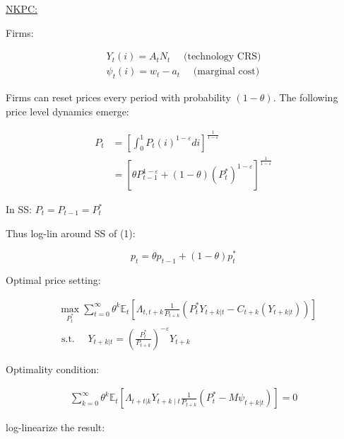 {\begin{enumerate}[label=(\alph*)]
{\underline{NKPC:}

Firms: 

\begin{align*}
    Y_{t}(i)=A_{t} N_{t} \quad \text{ (technology CRS)} \\
    \psi_{t}(i)=w_{t}-a_{t}\quad \text{ (marginal cost)}
\end{align*}

Firms can reset prices every period with probability $(1-\theta)$. The following price level dynamics emerge:

\begin{align*}
P_{t} & =\left[\int_{0}^{1} P_{t}(i)^{1-\varepsilon} d i\right]^{\frac{1}{1-\varepsilon}} \\
& =\left[\theta P_{t-1}^{1-\varepsilon}+(1-\theta)\left(P_{t}^{*}\right)^{1-\varepsilon}\right]^{\frac{1}{1-\varepsilon}} \tag{1}
\end{align*}

In SS: $P_{t}=P_{t-1}=P_{t}^{*}$

Thus log-lin around SS of (1):

$$
p_{t}=\theta p_{t-1}+(1-\theta) p_{t}^{*}
$$

Optimal price setting:

$$
\begin{aligned}
& \max _{P_{t}^{*}} \sum_{t=0}^{\infty} \theta^{k} \mathbb{E}_{t}\left[\Lambda_{t, t+k} \frac{1}{P_{t+k}}\left(P_{t}^{*} Y_{t+k|t}-C_{t+k}\left(Y_{t+k | t}\right)\right)\right] \\
& \text { s.t. } \quad Y_{t+k| t}=\left(\frac{P_{t}^{*}}{P_{t+k}}\right)^{-\varepsilon} Y_{t+k}
\end{aligned}
$$

Optimality condition:

$$
\begin{gathered}
\sum_{k=0}^{\infty} \theta^{k} \mathbb{E}_{t}\left[\Lambda_{t+t|k} Y_{t+k \mid t} \frac{1}{P_{t+k}}\left(P_{t}^{*}-M \psi_{t+k |t}\right)\right]=0
\end{gathered}
$$

log-linearize the result:

}
\end{enumerate}}
